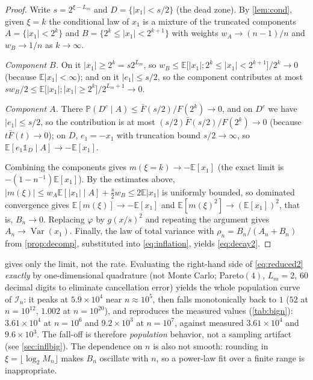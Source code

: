 \documentclass[review,hidelinks,oneeqnum,onetabnum,onefignum,onethmnum]{siamart251216}
\begin{document}
\begin{proof}
Write $s=2^{\xi-L_m}$ and $D=\{|x_1|<s/2\}$ (the dead zone). By \cref{lem:cond},
given $\xi=k$ the conditional law of $x_1$ is a mixture of the truncated
components $A=\{|x_1|<2^k\}$ and $B=\{2^k\le|x_1|<2^{k+1}\}$ with weights
$w_A\to(n-1)/n$ and $w_B\to1/n$ as $k\to\infty$.

\emph{Component $B$.} On it $|x_1|\ge2^k=s2^{L_m}$, so
$w_B\le\mathbb E\bigl[|x_1|;2^k\le|x_1|<2^{k+1}\bigr]/2^k\to0$ (because
$\mathbb E|x_1|<\infty$); and on it $|e_1|\le s/2$, so the component contributes
at most
$s w_B/2\le\mathbb E\bigl[|x_1|;|x_1|\ge2^k\bigr]/2^{L_m+1}\to0$.

\emph{Component $A$.} There
$\mathbb P(D^c\mid A)\le\bar F(s/2)/F(2^k)\to0$, and on $D^c$ we have
$|e_1|\le s/2$, so the contribution is at most
$(s/2)\bar F(s/2)/F(2^k)\to0$ (because $t\bar F(t)\to0$); on $D$, $e_1=-x_1$
with truncation bound $s/2\to\infty$, so
$\mathbb E[e_1\mathbb 1_D\mid A]\to-\mathbb E[x_1]$.

Combining the components gives $m(\xi=k)\to-\mathbb E[x_1]$ (the exact limit
is $-(1-n^{-1})\mathbb E[x_1]$). By the estimates above,
$|m(\xi)|\le w_A\mathbb E[|x_1|\mid A]+\tfrac s2w_B\le2\mathbb E|x_1|$ is
uniformly bounded, so dominated convergence gives
$\mathbb E[m(\xi)]\to-\mathbb E[x_1]$ and
$\mathbb E[m(\xi)^2]\to(\mathbb E[x_1])^2$, that is, $B_n\to0$. Replacing
$\varphi$ by $g(x/s)^2$ and repeating the argument gives
$A_n\to\operatorname{Var}(x_1)$. Finally, the law of total variance with
$\rho_n=B_n/(A_n+B_n)$ from \cref{prop:decomp}, substituted into
\cref{eq:inflation}, yields \cref{eq:decay2}.
\end{proof}

\begin{remark}
 gives only the limit, not the rate. Evaluating the right-hand
side of \cref{eq:reduced2} \emph{exactly} by one-dimensional quadrature (not
Monte Carlo; Pareto$(4)$, $L_m=2$, $60$ decimal digits to eliminate cancellation
error) yields the whole population curve of $\mathcal I_n$: it peaks at
$5.9\times10^4$ near $n\approx10^5$, then falls monotonically back to $1$ ($52$
at $n=10^{12}$, $1.002$ at $n=10^{20}$), and reproduces the measured values
(\cref{tab:bign}): $3.61\times10^4$ at $n=10^6$ and $9.2\times10^3$ at $n=10^7$,
against measured $3.61\times10^4$ and $9.6\times10^3$. The fall-off is therefore
\emph{population} behavior, not a sampling artifact (see \cref{sec:inflbig}).
The dependence on $n$ is also not smooth: rounding in
$\xi=\lfloor\log_2M_n\rfloor$ makes $B_n$ oscillate with $n$, so a power-law fit
over a finite range is inappropriate.
\end{remark}
\end{document}
